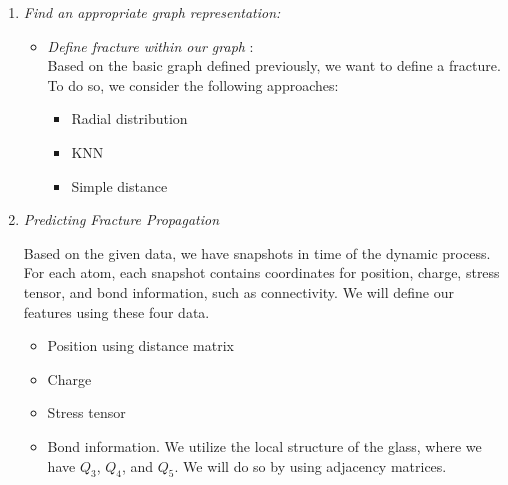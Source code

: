 \begin{enumerate}

    \item \emph{Find an appropriate graph representation: }

    \begin{itemize}
        Option 1: We define each atom, either a Si or Oxygen, as a node. Each node has features associated with it, such as position (defined by coordinates), charge, stress tensor, and bond information. An edge is the bond relationship between two nodes. There are no special features of the edges. Any fracture nucleation event originates from bonds breaking, which could happen between any pair of nodes, but especially those between Si and Oxygen atoms.
        \\
        Option 2: we define each node as a molecule, meaning one Si atom bonded with four oxygen. While stress is applied to the glass, bonds between atoms and molecules break. As atoms are pulled away from each other, the size of a node changes as well.
        
        \item \emph{Define fracture within our graph} : 
        \\Based on the basic graph defined previously, we want to define a fracture. To do so, we consider the following approaches:
        \begin{itemize}
            \item Radial distribution
            \item KNN
            \item Simple distance
        \end{itemize}
    \end{itemize}

    \item \emph{Predicting Fracture Propagation} 


            Based on the given data, we have snapshots in time of the dynamic process. For each  atom, each snapshot contains coordinates for position, charge, stress tensor, and bond information, such as connectivity. We will define our features using these four data.
        \begin{itemize}
            \item Position using distance matrix
            \item Charge
            \item Stress tensor
            \item Bond information. We utilize the local structure of the glass, where we have $Q_3$, $Q_4$, and $Q_5$. We will do so by using adjacency matrices.
        \end{itemize}


\end{enumerate}

